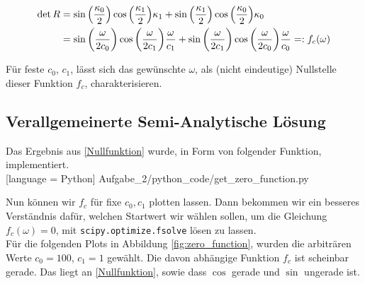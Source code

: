 \begin{align} \label{Nullfunktion}
  \nonumber
  \det{R}
  & = \sin{\left(\frac{{\kappa}_{0}}{2} \right)} \cos{\left(\frac{{\kappa}_{1}}{2} \right)} {\kappa}_{1} + \sin{\left(\frac{{\kappa}_{1}}{2} \right)} \cos{\left(\frac{{\kappa}_{0}}{2} \right)} {\kappa}_{0} \\
  & = \sin{{\left ( \frac{\omega}{2 c_0} \right )}}
      \cos{{\left ( \frac{\omega}{2 c_1} \right )}}
      \frac{\omega}{c_1} +
      \sin{{\left ( \frac{\omega}{2 c_1} \right )}}
      \cos{{\left ( \frac{\omega}{2 c_0} \right )}}
      \frac{\omega}{c_0} =: f_c(\omega)
\end{align}

Für feste $c_0$, $c_1$, lässt sich das gewünschte $\omega$, als (nicht eindeutige) Nullstelle dieser Funktion $f_c$, charakterisieren.

\subsection{Verallgemeinerte Semi-Analytische Lösung}

Das Ergebnis aus \eqref{Nullfunktion} wurde, in Form von folgender Funktion, implementiert. \\


[language = Python]
{Aufgabe_2/python_code/get_zero_function.py}
\vspace{10pt}

Nun können wir $f_c$ für fixe $c_0, c_1$ plotten lassen. Dann bekommen wir ein besseres Verständnis dafür, welchen Startwert wir wählen sollen, um die Gleichung $f_c(\omega) = 0$, mit \verb|scipy.optimize.fsolve| lösen zu lassen. \\

Für die folgenden Plots in Abbildung \ref{fig:zero_function}, wurden die arbiträren Werte $c_0 = 100$, $c_1 = 1$ gewählt. Die davon abhängige Funktion $f_c$ ist scheinbar gerade. Das liegt an \eqref{Nullfunktion}, sowie dass $\cos$ gerade und $\sin$ ungerade ist.

